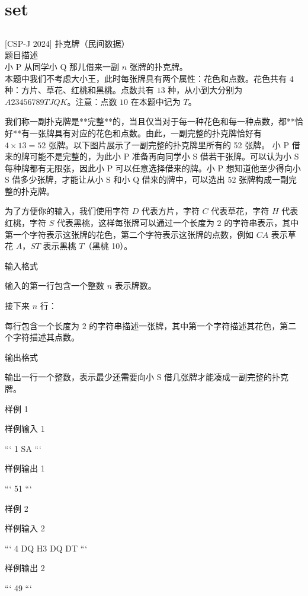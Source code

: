 \documentclass[12pt,twiside,a4paper]{ctexbook}
\numberwithin{chapter}{part}
\begin{document}
\chapter{set}
\section{}
 [CSP-J 2024] 扑克牌（民间数据）\\
 题目描述\\
小 P 从同学小 Q 那儿借来一副 $n$ 张牌的扑克牌。\\
本题中我们不考虑大小王，此时每张牌具有两个属性：花色和点数。花色共有 $4$ 种：方片、草花、红桃和黑桃。点数共有 $13$ 种，从小到大分别为 $A 2 3 4 5 6 7 8 9 T J Q K$。注意：点数 $10$ 在本题中记为 $T$。

我们称一副扑克牌是**完整**的，当且仅当对于每一种花色和每一种点数，都**恰好**有一张牌具有对应的花色和点数。由此，一副完整的扑克牌恰好有 $4 \times 13 = 52$ 张牌。以下图片展示了一副完整的扑克牌里所有的 52 张牌。
小 P 借来的牌可能不是完整的，为此小 P 准备再向同学小 S 借若干张牌。可以认为小 S 每种牌都有无限张，因此小 P 可以任意选择借来的牌。小 P 想知道他至少得向小 S 借多少张牌，才能让从小 S 和小 Q 借来的牌中，可以选出 $52$ 张牌构成一副完整的扑克牌。

为了方便你的输入，我们使用字符 $ D$ 代表方片，字符 $ C$ 代表草花，字符 $ H$ 代表红桃，字符 $ S$ 代表黑桃，这样每张牌可以通过一个长度为 $2$ 的字符串表示，其中第一个字符表示这张牌的花色，第二个字符表示这张牌的点数，例如 ${CA}$ 表示草花 $ A$，${ST}$ 表示黑桃 $ T$（黑桃 10）。

 输入格式

输入的第一行包含一个整数 $n$ 表示牌数。

接下来 $n$ 行：

每行包含一个长度为 $2$ 的字符串描述一张牌，其中第一个字符描述其花色，第二个字符描述其点数。

 输出格式

输出一行一个整数，表示最少还需要向小 S 借几张牌才能凑成一副完整的扑克牌。

 样例 1

 样例输入 1

```
1
SA
```

 样例输出 1

```
51
```

 样例 2

 样例输入 2

```
4
DQ
H3
DQ
DT
```

 样例输出 2

```
49
```
\end{document}
